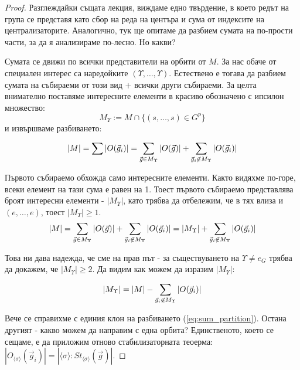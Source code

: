 \documentclass{article}
\theoremstyle{definition}
\newcommand{\grsigma}[0]{{\langle \sigma \rangle}}
\begin{document}
\begin{proof}
    Разглеждайки същата лекция, виждаме едно твърдение, в което редът на група се представя като сбор на реда на центъра и сума от индексите на централизаторите.
    Аналогично, тук ще опитаме да разбием сумата на по-прости части, за да я анализираме по-лесно. Но какви?

    Сумата се движи по всички представители на орбити от $M$. За нас обаче от специален интерес са наредойките $(\Upsilon,\dots,\Upsilon)$.
    Естествено е тогава да разбием сумата на събираеми от този вид $+$ всички други събираеми.
    За целта внимателно поставяме интересните елементи в красиво обозначено с ипсилон множество:
    $$M_\Upsilon := M \cap \{(s,\dots,s) \in G^p\}$$
    и извършваме разбиването:

    \begin{equation}
        \label{eq:sum_partition}
        |M| = \sum |O(\vec g_i)| = \sum_{\vec g \in M_\Upsilon} |O(\vec g)| + \sum_{{\vec g_i \not\in M_\Upsilon}} |O(\vec g_i)|
    \end{equation}

    Първото събираемо обхожда само интересните елементи.
    Както видяхме по-горе, всеки елемент на тази сума е равен на 1.
    Тоест първото събираемо представлява броят интересни елементи - $|M_\Upsilon|$, като трябва да отбележим, че в тях влиза и $(e, \dots, e)$, тоест $|M_\Upsilon| \ge 1$.
    $$|M| = \sum_{\vec g \in M_\Upsilon} |O(\vec g)| + \sum_{{\vec g_i \not\in M_\Upsilon}} |O(\vec g_i)|=|M_\Upsilon| + \sum_{{\vec g_i \not\in M_\Upsilon}} |O(\vec g_i)|$$

    Това ни дава надежда, че сме на прав път - за съществуването на $\Upsilon \not= e_G$ трябва да докажем, че $|M_\Upsilon|\ge 2$.
    Да видим как можем да изразим $|M_\Upsilon|$:

    $$|M_\Upsilon| = |M| - \sum_{{\vec g_i \not\in M_\Upsilon}} |O(\vec g_i)|$$



    Вече се справихме с единия клон на разбиването (\ref{eq:sum_partition}).
    Остана другият - какво можем да направим с една орбита?
    Единственото, което се сещаме, е да приложим отново стабилизаторната теоерма:
    ${|O_{\grsigma}(\vec g_i)| = |\grsigma:St_{\grsigma}(\vec g)|}$.


\end{proof}
\end{document}
